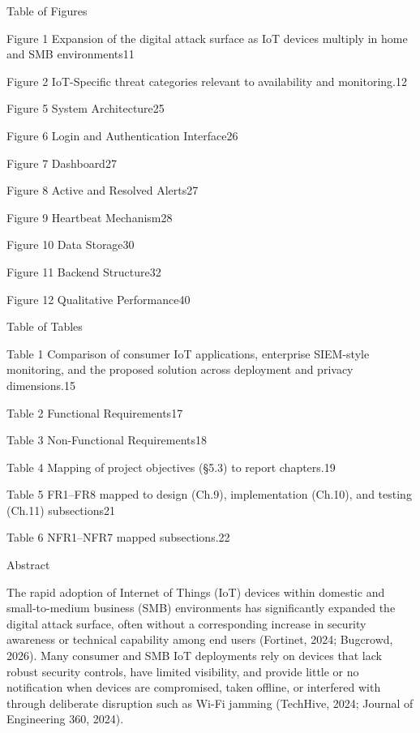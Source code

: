 
Table of Figures

Figure 1 Expansion of the digital attack surface as IoT devices multiply in home and SMB environments11

Figure 2 IoT-Specific threat categories relevant to availability and monitoring.12

Figure 5 System Architecture25

Figure 6 Login and Authentication Interface26

Figure 7 Dashboard27

Figure 8 Active and Resolved Alerts27

Figure 9 Heartbeat Mechanism28

Figure 10 Data Storage30

Figure 11 Backend Structure32

Figure 12 Qualitative Performance40

Table of Tables

Table 1 Comparison of consumer IoT applications, enterprise SIEM-style monitoring, and the proposed solution across deployment and privacy dimensions.15

Table 2 Functional Requirements17

Table 3 Non-Functional Requirements18

Table 4 Mapping of project objectives (\S{}5.3) to report chapters.19

Table 5 FR1--FR8 mapped to design (Ch.9), implementation (Ch.10), and testing (Ch.11) subsections21

Table 6 NFR1--NFR7 mapped subsections.22

Abstract

The rapid adoption of Internet of Things (IoT) devices within domestic and small-to-medium business (SMB) environments has significantly expanded the digital attack surface, often without a corresponding increase in security awareness or technical capability among end users (Fortinet, 2024; Bugcrowd, 2026). Many consumer and SMB IoT deployments rely on devices that lack robust security controls, have limited visibility, and provide little or no notification when devices are compromised, taken offline, or interfered with through deliberate disruption such as Wi-Fi jamming (TechHive, 2024; Journal of Engineering 360, 2024).

